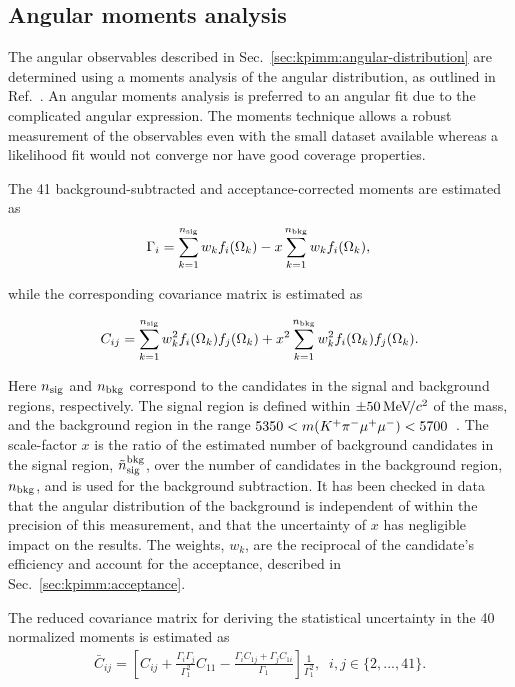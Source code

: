 \subsection{Angular moments analysis}
\label{sec:kpimm:angular-analysis}

The angular observables described in Sec.~\ref{sec:kpimm:angular-distribution} are determined using a moments analysis of the angular distribution, as outlined in Ref.~\cite{biplab}. An angular moments analysis is preferred to an angular fit due to the complicated angular expression. The moments technique allows a robust measurement of the observables even with the small dataset available whereas a likelihood fit would not converge nor have good coverage properties.

The 41 background-subtracted and acceptance-corrected moments are estimated as
\begin{equation}
 \label{eqn:moments}
\Gamma_i =  \sum_{k=1}^{n_{\rm sig}} w_{k}f_i(\Omega_k)  - x\sum_{k=1}^{n_{\rm bkg}} w_{k}f_i(\Omega_k),\\
\end{equation}

\noindent while the corresponding covariance matrix is estimated as

\begin{equation}
 \label{eqn:covariance}
 C_{ij} = \sum_{k=1}^{n_{\rm sig}} w^{2}_{k}f_i(\Omega_k)f_j(\Omega_k)   + x^2\sum_{k=1}^{n_{\rm bkg}} w^{2}_{k}f_i(\Omega_k)f_j(\Omega_k).
\end{equation}

\noindent Here $n_{\rm sig}$ and $n_{\rm bkg}$ correspond to the candidates in the signal and background regions, respectively. The signal region is defined within $\pm 50{\mathrm{\,Me\kern -0.1em V\!/}c^2}$ of the \Bz mass, and the background region in the range $5350<m({{K}^+}{{\pi}^-}{\mu^+}{\mu^-})<5700$~\mevcc.  The scale-factor $x$ is the ratio of the estimated number of background candidates in the signal region, $\tilde{n}^{\rm bkg}_{\rm sig}$, over the number of candidates in the background region, $n_{\rm bkg}$, and is used for the background subtraction.
It has been checked in data that the angular distribution of the background is independent of \mkpimm within the precision of this measurement, and that the uncertainty of $x$ has negligible impact on the results.
The weights, $w_{k}$, are the reciprocal of the candidate's efficiency and account for the acceptance, described in Sec.~\ref{sec:kpimm:acceptance}.

The reduced covariance matrix for deriving the statistical uncertainty in the 40 normalized moments is estimated as
\begin{align}
\label{eqn:red_cov_def}
\bar{C}_{ij} = \left[C_{ij} + \frac{\Gamma_i \Gamma_j}{\Gamma_1^2} C_{11} - \frac{\Gamma_i C_{1j} + \Gamma_j C_{1i}}{\Gamma_1}\right] \frac{1}{\Gamma_1^2},  \;\; i,j \in \{2,...,41\}.
\end{align}

